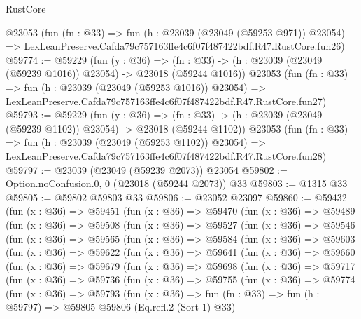 \begin{lexlean}{RustCore}
\begin{coremodule}
    @23053
    (fun (fn : @33) =>
    fun (h : @23039 (@23049 (@59253 @971)) @23054) =>
    LexLeanPreserve.Cafda79c757163ffe4c6f07f487422bdf.R47.RustCore.fun26)
@59774 := @59229
    (fun (y : @36) =>
    (fn : @33) -> (h : @23039 (@23049 (@59239 @1016)) @23054) -> @23018 (@59244 @1016))
    @23053
    (fun (fn : @33) =>
    fun (h : @23039 (@23049 (@59253 @1016)) @23054) =>
    LexLeanPreserve.Cafda79c757163ffe4c6f07f487422bdf.R47.RustCore.fun27)
@59793 := @59229
    (fun (y : @36) =>
    (fn : @33) -> (h : @23039 (@23049 (@59239 @1102)) @23054) -> @23018 (@59244 @1102))
    @23053
    (fun (fn : @33) =>
    fun (h : @23039 (@23049 (@59253 @1102)) @23054) =>
    LexLeanPreserve.Cafda79c757163ffe4c6f07f487422bdf.R47.RustCore.fun28)
@59797 := @23039 (@23049 (@59239 @2073)) @23054
@59802 := Option.noConfusion.{0, 0} (@23018 (@59244 @2073)) @33
@59803 := @1315 @33
@59805 := @59802 @59803 @33
@59806 := @23052 @23097
@59860 := @59432
    (fun (x : @36) =>
    @59451
      (fun (x : @36) =>
      @59470
        (fun (x : @36) =>
        @59489
          (fun (x : @36) =>
          @59508
            (fun (x : @36) =>
            @59527
              (fun (x : @36) =>
              @59546
                (fun (x : @36) =>
                @59565
                  (fun (x : @36) =>
                  @59584
                    (fun (x : @36) =>
                    @59603
                      (fun (x : @36) =>
                      @59622
                        (fun (x : @36) =>
                        @59641
                          (fun (x : @36) =>
                          @59660
                            (fun (x : @36) =>
                            @59679
                              (fun (x : @36) =>
                              @59698
                                (fun (x : @36) =>
                                @59717
                                  (fun (x : @36) =>
                                  @59736
                                    (fun (x : @36) =>
                                    @59755
                                      (fun (x : @36) =>
                                      @59774
                                        (fun (x : @36) =>
                                        @59793
                                          (fun (x : @36) =>
                                          fun (fn : @33) =>
                                          fun (h : @59797) =>
                                          @59805
                                            @59806
                                            (Eq.refl.{2} (Sort 1) @33)

\end{coremodule}
\end{lexlean}
